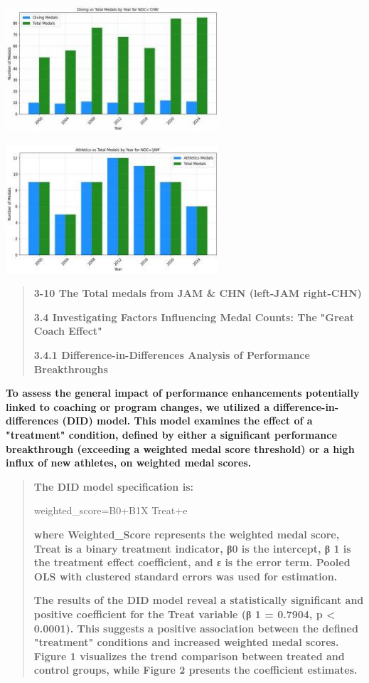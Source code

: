 \documentclass[12pt,a4paper]{article}
\renewenvironment{quote}{\begin{quotation}}{\end{quotation}}  %
\begin{document}
    \includegraphics[width=3.115in,height=1.85833in]{./media/media/image18.jpeg}
    
    \includegraphics[width=3.12167in,height=1.86167in]{./media/media/image19.jpeg}
    
    \begin{quote}
    \textbf{3-10 The Total medals from JAM \& CHN (left-JAM right-CHN)}
    
    \textbf{3.4 Investigating Factors Influencing Medal Counts: The}
    \protect{}\label{bookmark18}{}\textbf{"Great Coach Effect"}
    
    \protect{}\label{bookmark19-1}{}\textbf{3.4.1
    Difference-in-Differences Analysis of Performance Breakthroughs}
    \end{quote}
    
    \textbf{To assess the general impact of performance enhancements
    potentially linked to coaching or program changes, we utilized a
    difference-in-differences (DID) model. This model examines the effect of
    a "treatment" condition, defined by either a significant performance
    breakthrough (exceeding a weighted medal score threshold) or a high
    influx of new athletes, on weighted medal scores.}
    
    \begin{quote}
    \textbf{The DID model specification is:}
    
    weighted\_score=B0+B1X Treat+e
    
    \textbf{where Weighted\_Score represents the weighted medal score, Treat
    is a binary treatment indicator, β0 is the intercept, β 1 is the
    treatment effect coefficient, and ε is the error term. Pooled OLS with
    clustered standard errors was used for estimation.}
    
    \textbf{The results of the DID model reveal a statistically significant
    and positive coefficient for the Treat variable (β 1 = 0.7904, p
    \textless{} 0.0001). This suggests a positive association between the
    defined "treatment" conditions and increased weighted medal scores.
    Figure 1 visualizes the trend comparison between treated and control
    groups, while Figure 2 presents the coefficient estimates.}
    \end{quote}
    
\end{document}
